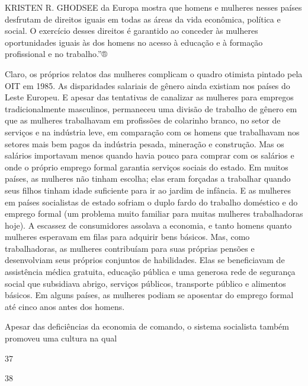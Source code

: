  \par 
KRISTEN R. GHODSEE da Europa mostra que homens e mulheres nesses países desfrutam de direitos iguais em todas as áreas da vida econômica, política e social. O exercício desses direitos é garantido ao conceder às mulheres oportunidades iguais às dos homens no acesso à educação e à formação profissional e no trabalho.”®
 \par 
Claro, os próprios relatos das mulheres complicam o quadro otimista pintado pela OIT em 1985. As disparidades salariais de gênero ainda existiam nos países do Leste Europeu. E apesar das tentativas de canalizar as mulheres para empregos tradicionalmente masculinos, permaneceu uma divisão de trabalho de gênero em que as mulheres trabalhavam em profissões de colarinho branco, no setor de serviços e na indústria leve, em comparação com os homens que trabalhavam nos setores mais bem pagos da indústria pesada, mineração e construção. Mas os salários importavam menos quando havia pouco para comprar com os salários e onde o próprio emprego formal garantia serviços sociais do estado. Em muitos países, as mulheres não tinham escolha; elas eram forçadas a trabalhar quando seus filhos tinham idade suficiente para ir ao jardim de infância. E as mulheres em países socialistas de estado sofriam o duplo fardo do trabalho doméstico e do emprego formal (um problema muito familiar para muitas mulheres trabalhadoras hoje). A escassez de consumidores assolava a economia, e tanto homens quanto mulheres esperavam em filas para adquirir bens básicos. Mas, como trabalhadoras, as mulheres contribuíam para suas próprias pensões e desenvolviam seus próprios conjuntos de habilidades. Elas se beneficiavam de assistência médica gratuita, educação pública e uma generosa rede de segurança social que subsidiava abrigo, serviços públicos, transporte público e alimentos básicos. Em alguns países, as mulheres podiam se aposentar do emprego formal até cinco anos antes dos homens.
 \par 
Apesar das deficiências da economia de comando, o sistema socialista também promoveu uma cultura na qual
 \par 
37
 \par 
38
 \par 
